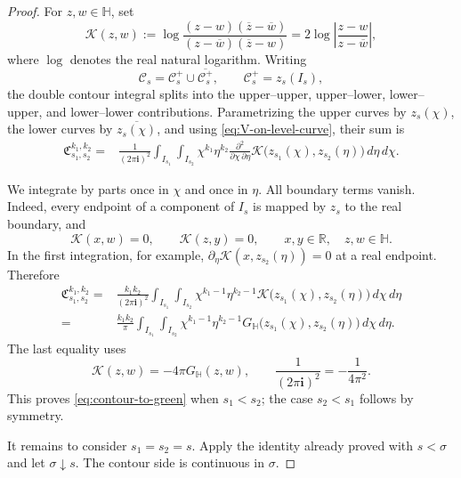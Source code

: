 \documentclass[11pt]{amsart}
\theoremstyle{plain}
\numberwithin{equation}{section}
\numberwithin{theorem}{section}
\numberwithin{figure}{section}
\begin{document}
\begin{proof}
For \(z,w\in\mathbb H\), set
\begin{equation}
    \mathscr K(z,w)
    :=
    \log
    \frac{(z-w)(\overline z-\overline w)}
         {(z-\overline w)(\overline z-w)}
    =
    2\log\left|\frac{z-w}{z-\overline w}\right|,
    \label{eq:green-cross-ratio}
\end{equation}
where \(\log\) denotes the real natural logarithm.  Writing
\[
    \mathscr C_s
    =
    \mathscr C_s^+\cup\overline{\mathscr C_s^+},
    \qquad
    \mathscr C_s^+=z_s(I_s),
\]
the double contour integral splits into the upper--upper,
upper--lower, lower--upper, and lower--lower contributions.
Parametrizing the upper curves by \(z_s(\chi)\), the lower curves by
\(\overline{z_s(\chi)}\), and using
\eqref{eq:V-on-level-curve}, their sum is
\begin{align}
    \mathfrak C_{s_1,s_2}^{k_1,k_2}
    ={}&
    \frac{1}{(2\pi\mathbf i)^2}
    \int_{I_{s_1}}\int_{I_{s_2}}
    \chi^{k_1}\eta^{k_2}
    \frac{\partial^2}{\partial\chi\,\partial\eta}
    \mathscr K
    \bigl(z_{s_1}(\chi),z_{s_2}(\eta)\bigr)
    \,d\eta\,d\chi.
    \label{eq:closed-contours-to-cross-ratio}
\end{align}


We integrate by parts once in \(\chi\) and once in \(\eta\).  All
boundary terms vanish.  Indeed, every endpoint of a component of
\(I_s\) is mapped by \(z_s\) to the real boundary, and
\[
    \mathscr K(x,w)=0,
    \qquad
    \mathscr K(z,y)=0,
    \qquad x,y\in\mathbb R,\quad z,w\in\mathbb H.
\]
In the first integration, for example,
\(\partial_\eta\mathscr K(x,z_{s_2}(\eta))=0\) at a real endpoint.
Therefore
\begin{align*}
    \mathfrak C_{s_1,s_2}^{k_1,k_2}
    ={}&
    \frac{k_1k_2}{(2\pi\mathbf i)^2}
    \int_{I_{s_1}}\int_{I_{s_2}}
    \chi^{k_1-1}\eta^{k_2-1}
    \mathscr K\bigl(z_{s_1}(\chi),z_{s_2}(\eta)\bigr)
    \,d\chi\,d\eta
    \\
    ={}&
    \frac{k_1k_2}{\pi}
    \int_{I_{s_1}}\int_{I_{s_2}}
    \chi^{k_1-1}\eta^{k_2-1}
    G_{\mathbb H}\bigl(z_{s_1}(\chi),z_{s_2}(\eta)\bigr)
    \,d\chi\,d\eta.
\end{align*}
The last equality uses
\[
    \mathscr K(z,w)=-4\pi G_{\mathbb H}(z,w),
    \qquad
    \frac{1}{(2\pi\mathbf i)^2}=-\frac{1}{4\pi^2}.
\]
This proves \eqref{eq:contour-to-green} when \(s_1<s_2\); the case
\(s_2<s_1\) follows by symmetry.

It remains to consider \(s_1=s_2=s\). Apply the identity already
proved with \(s<\sigma\) and let \(\sigma\downarrow s\). The contour
side is continuous in \(\sigma\).


\end{proof}
\end{document}
